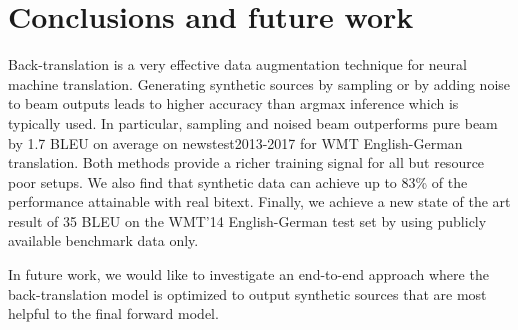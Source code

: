 \documentclass[11pt,a4paper]{article}
\begin{document}
\section{Conclusions and future work}
\label{sec:ccl}

Back-translation is a very effective data augmentation technique for neural machine translation. 
Generating synthetic sources by sampling or by adding noise to beam outputs leads to higher accuracy than argmax inference which is typically used. 
In particular, sampling and noised beam outperforms pure beam by 1.7 BLEU on average on newstest2013-2017 for WMT English-German translation.
Both methods provide a richer training signal for all but resource poor setups.
We also find that synthetic data can achieve up to 83\% of the performance attainable with real bitext. 
Finally, we achieve a new state of the art result of 35 BLEU on the WMT'14 English-German test set by using publicly available benchmark data only.

In future work, we would like to investigate an end-to-end approach where the back-translation model is optimized to output synthetic sources that are most helpful to the final forward model.



\end{document}
